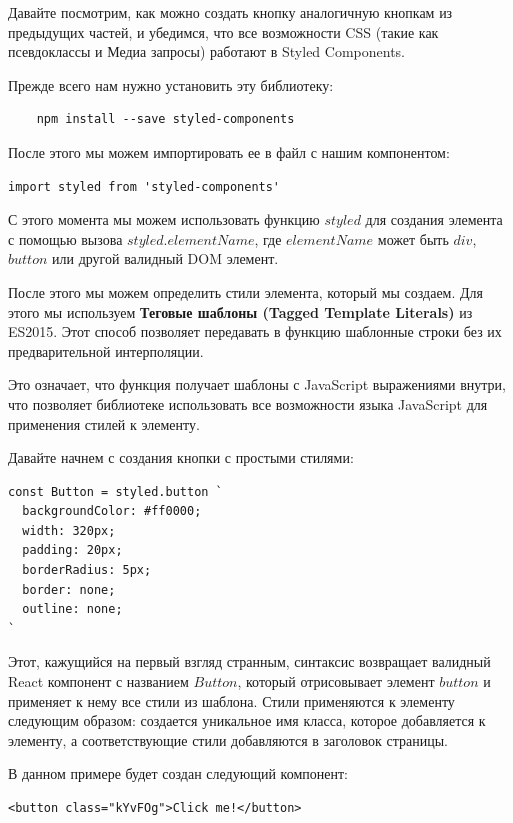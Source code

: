 Давайте посмотрим, как можно создать кнопку аналогичную кнопкам из предыдущих частей, и убедимся, что все возможности CSS (такие как псевдоклассы и Медиа запросы) работают в Styled Components.

Прежде всего нам нужно установить эту библиотеку:

\begin{lstlisting}
	npm install --save styled-components
\end{lstlisting}

После этого мы можем импортировать ее в файл с нашим компонентом:

\begin{lstlisting}
import styled from 'styled-components'
\end{lstlisting}

С этого момента мы можем использовать функцию $styled$ для создания элемента с помощью вызова $styled.elementName$, где $elementName$ может быть $div$, $button$ или другой валидный DOM элемент.

После этого мы можем определить стили элемента, который мы создаем. Для этого мы используем \textbf{Теговые шаблоны (Tagged Template Literals)} из ES2015. Этот способ позволяет передавать в функцию шаблонные строки без их предварительной интерполяции.

Это означает, что функция получает шаблоны с JavaScript выражениями внутри, что позволяет библиотеке использовать все возможности языка JavaScript для применения стилей к элементу.

Давайте начнем с создания кнопки с простыми стилями:

\begin{lstlisting}
const Button = styled.button `
  backgroundColor: #ff0000;
  width: 320px;
  padding: 20px;
  borderRadius: 5px;
  border: none;
  outline: none;
`
\end{lstlisting}

Этот, кажущийся на первый взгляд странным, синтаксис возвращает валидный React компонент с названием $Button$, который отрисовывает элемент $button$ и применяет к нему все стили из шаблона. Стили применяются к элементу следующим образом: создается уникальное имя класса, которое добавляется к элементу, а соответствующие стили добавляются в заголовок страницы.

В данном примере будет создан следующий компонент:

\begin{lstlisting}
<button class="kYvFOg">Click me!</button>
\end{lstlisting}

